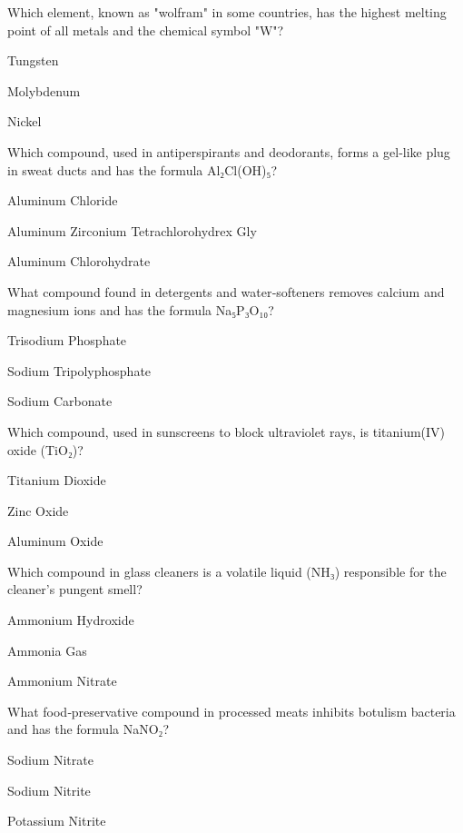 
\begin{enhancedmcq}{Which element, known as "wolfram" in some countries, has the highest melting point of all metals and the chemical symbol "W"?}
\item Tungsten
\item Molybdenum
\item Nickel

\end{enhancedmcq}
\begin{enhancedmcq}{Which compound, used in antiperspirants and deodorants, forms a gel‑like plug in sweat ducts and has the formula Al₂Cl(OH)₅?}
\item Aluminum Chloride
\item Aluminum Zirconium Tetrachlorohydrex Gly
\item Aluminum Chlorohydrate

\end{enhancedmcq}
\begin{enhancedmcq}{What compound found in detergents and water‑softeners removes calcium and magnesium ions and has the formula Na₅P₃O₁₀?}
\item Trisodium Phosphate
\item Sodium Tripolyphosphate
\item Sodium Carbonate

\end{enhancedmcq}
\begin{enhancedmcq}{Which compound, used in sunscreens to block ultraviolet rays, is titanium(IV) oxide (TiO₂)?}
\item Titanium Dioxide
\item Zinc Oxide
\item Aluminum Oxide

\end{enhancedmcq}
\begin{enhancedmcq}{Which compound in glass cleaners is a volatile liquid (NH₃) responsible for the cleaner's pungent smell?}
\item Ammonium Hydroxide
\item Ammonia Gas
\item Ammonium Nitrate

\end{enhancedmcq}
\begin{enhancedmcq}{What food‑preservative compound in processed meats inhibits botulism bacteria and has the formula NaNO₂?}
\item Sodium Nitrate
\item Sodium Nitrite
\item Potassium Nitrite

\end{enhancedmcq}
